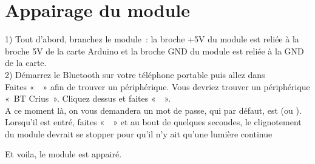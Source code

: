 \chapter{Appairage du module} \label{appairage}


1) Tout d'abord, branchez le module : la broche +5V du module est reliée à la broche 5V de la carte Arduino et la broche GND du module est reliée à la GND de la carte. \\


2) Démarrez le Bluetooth sur votre téléphone portable puis allez dans  \\
Faites «  » afin de trouver un périphérique. 
Vous devriez trouver un périphérique « BT Crius ». Cliquez dessus et faites «  ». \\
A ce moment là, on vous demandera un mot de passe, qui par défaut, est  (ou ). \\

Lorsqu'il est entré, faites «  » et au bout de quelques secondes, le clignotement du module devrait se stopper pour qu'il n'y ait qu'une lumière continue 



Et voila, le module est appairé.